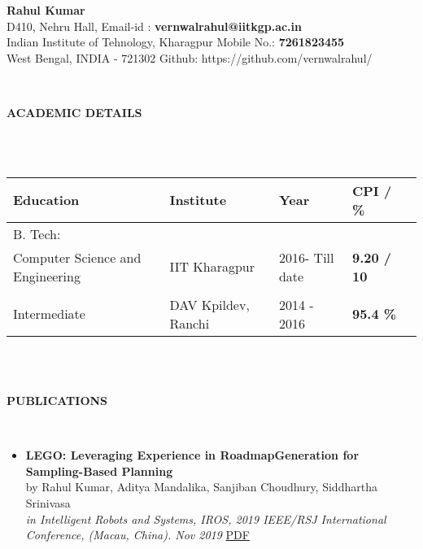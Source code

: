 \documentclass[a4paper,8pt]{article}
\newcommand{\lsep}{-0.5cm}
\newcommand{\resheading}[1]{{\small \colorbox{mygrey}{\begin{minipage}{0.975\textwidth}{\textbf{#1 \vphantom{p\^{E}}}}\end{minipage}}}}
\begin{document}
\begin{center}
\textbf{\Huge Rahul Kumar \\ }  
\indent \hfill \break
\indent D410, Nehru Hall, \hfill Email-id : \textbf{vernwalrahul@iitkgp.ac.in} \\
\indent Indian Institute of Tehnology, Kharagpur \hfill Mobile No.: \textbf{7261823455} \\
\indent West Bengal, INDIA - 721302  \hfill Github: {https://github.com/vernwalrahul/} \\
\end{center}

\hspace{0.5cm}\\[-0.2cm]
\resheading{\textbf{ACADEMIC DETAILS} }\\[\lsep]
\\ 

\indent \begin{tabular}{ l @{\hskip 0.25in} l @{\hskip 0.25in} l @{\hskip 0.25in} l @{\hskip 0.25in} l }
\hline
\textbf{Education} & \textbf{Institute} & \textbf{Year} & \textbf{CPI / \%} \\
\hline
B. Tech:\\
{Computer Science and Engineering} & IIT Kharagpur  & 2016- Till date & \textbf{9.20 / 10} \\ \\
Intermediate & DAV Kpildev, Ranchi & 2014 - 2016 & \textbf{95.4 \%}\\
\hline
\end{tabular}
\\ \hfill \break \\
\resheading{\textbf{ PUBLICATIONS} }\\[\lsep]
\begin{itemize} 
\item \textbf{LEGO: Leveraging Experience in RoadmapGeneration for Sampling-Based Planning} \\
	by Rahul Kumar, Aditya Mandalika, Sanjiban Choudhury, Siddhartha Srinivasa \\ 
	\textit{in Intelligent Robots and Systems, IROS, 2019 IEEE/RSJ International Conference, (Macau, China). Nov 2019} \href{https://arxiv.org/abs/1907.09574} {PDF}

\end{itemize}
\end{document}
